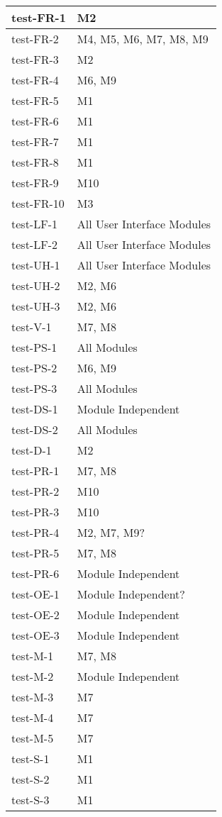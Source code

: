 \documentclass[12pt, titlepage]{article}
\begin{document}
\begin{center}
\begin{longtable}{|>{\centering\arraybackslash}p{4cm}|>{\centering\arraybackslash}p{10cm}|}
    test-FR-1 &  M2\\
    \hline
    test-FR-2 & M4, M5, M6, M7, M8, M9\\
    \hline
    test-FR-3 & M2 \\
    \hline
    test-FR-4 & M6, M9 \\
    \hline
    test-FR-5 & M1 \\
    \hline
    test-FR-6 & M1 \\
    \hline
    test-FR-7 & M1 \\
    \hline
    test-FR-8 & M1 \\
    \hline
    test-FR-9 & M10 \\
    \hline
    test-FR-10 & M3 \\
    \hline
    test-LF-1 & All User Interface Modules \\
    \hline
    test-LF-2 & All User Interface Modules \\
    \hline
    test-UH-1 & All User Interface Modules \\
    \hline
    test-UH-2 & M2, M6 \\
    \hline
    test-UH-3 & M2, M6 \\
    \hline
    test-V-1 &  M7, M8 \\
    \hline
    test-PS-1 &  All Modules\\
    \hline
    test-PS-2 &  M6, M9 \\
    \hline
    test-PS-3 & All Modules \\
    \hline
    test-DS-1 &  Module Independent\\
    \hline
    test-DS-2 & All Modules\\
    \hline
    test-D-1 & M2\\
    \hline
    test-PR-1 &  M7, M8\\
    \hline
    test-PR-2 &  M10\\
    \hline
    test-PR-3 & M10\\
    \hline
    test-PR-4 &  M2, M7, M9?\\
    \hline
    test-PR-5 &  M7, M8\\
    \hline
    test-PR-6 &  Module Independent\\
    \hline
    test-OE-1 & Module Independent?\\
    \hline
    test-OE-2 & Module Independent\\
    \hline
    test-OE-3 & Module Independent\\
    \hline
    test-M-1 & M7, M8 \\
    \hline
    test-M-2 & Module Independent\\
    \hline
    test-M-3 & M7 \\
    \hline
    test-M-4 & M7 \\
    \hline
    test-M-5 & M7 \\
    \hline
    test-S-1 & M1 \\
    \hline
    test-S-2 & M1 \\
    \hline
    test-S-3 & M1 \\
    \hline
  

\end{longtable}
\end{center}
\end{document}
